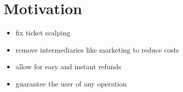 \section{Motivation}

 {\color{red}
  \begin{itemize}
      \item fix ticket scalping
      \item remove intermediaries like marketing to reduce costs
      \item allow for easy and instant refunds
      \item guarantee the user of any operation
  \end{itemize}
 }